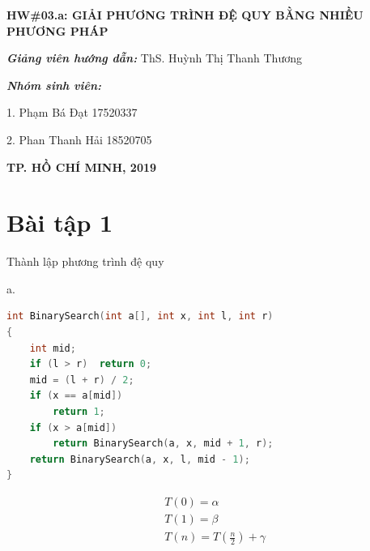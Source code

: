 \documentclass[12pt, a4paper, fleqn]{article}
\begin{document}
\begin{titlepage}
\begin{center}
			\vspace{2cm}
			
			\Large
			\textbf{HW\#03.a: GIẢI PHƯƠNG TRÌNH ĐỆ QUY BẰNG NHIỀU PHƯƠNG PHÁP}
		
		\end{center}
			
			\vspace{3cm}
			\normalsize	
			
			\hspace{70pt} \textbf{\textit{Giảng viên hướng dẫn:}} ThS. Huỳnh Thị Thanh Thương\\
			
			\vspace*{1cm}
			
			\hspace{70pt} \textbf{\textit{Nhóm sinh viên:}}
			
			\vspace*{0.2cm}
			
			\hspace{70pt} 1. \hspace{10pt} Phạm Bá Đạt \hspace{60pt} 17520337
			
			\vspace*{0.2cm}
			\hspace{70pt} 2. \hspace{10pt} Phan Thanh Hải  \hspace{45pt} 18520705
			
			\vspace{4cm}
		
		\begin{center}
			\textbf{TP. HỒ CHÍ MINH, 2019}
		\end{center}
			
	\end{titlepage}

	\begin{center}
		\tableofcontents
	\end{center}
	\clearpage
	
	\setlength{\abovedisplayskip}{5pt}
	\setlength{\belowdisplayskip}{5pt}
	
\section*{Bài tập 1}
Thành lập phương trình đệ quy
	
a.
\begin{lstlisting}[language = C++]
int BinarySearch(int a[], int x, int l, int r)
{
	int mid;
	if (l > r)	return 0;
	mid = (l + r) / 2;
	if (x == a[mid])
		return 1;
	if (x > a[mid])
		return BinarySearch(a, x, mid + 1, r);
	return BinarySearch(a, x, l, mid - 1);
}
\end{lstlisting}
\begin{align*}
&T(0)=\alpha\\
&T(1)=\beta\\
&T(n)=T\left(\frac{n}{2}\right) + \gamma
\end{align*}
\end{document}
